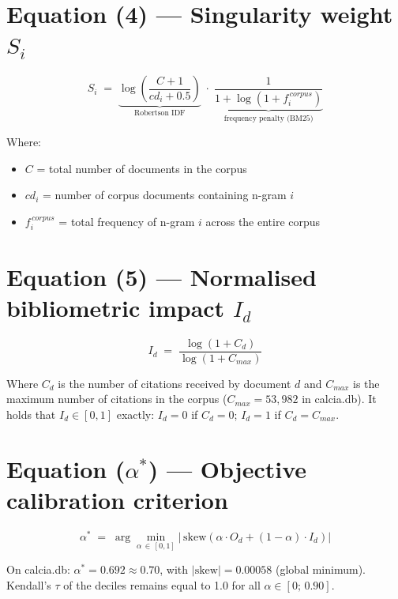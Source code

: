 \documentclass[12pt]{article}
\begin{document}
\section*{Equation (4) — Singularity weight $S_i$}

\begin{equation}
S_i \;=\;
\underbrace{\log\!\left(\frac{C+1}{cd_i + 0{.}5}\right)}_{\text{Robertson IDF}}
\;\cdot\;
\underbrace{\frac{1}{1 + \log\!\left(1 + f_i^{\,corpus}\right)}}_{\text{frequency penalty (BM25)}}
\label{eq:si}
\end{equation}

\noindent
Where:
\begin{itemize}
  \item $C$ = total number of documents in the corpus
  \item $cd_i$ = number of corpus documents containing n-gram $i$
  \item $f_i^{\,corpus}$ = total frequency of n-gram $i$ across the entire corpus
\end{itemize}

\section*{Equation (5) — Normalised bibliometric impact $I_d$}

\begin{equation}
I_d \;=\; \frac{\log(1 + C_d)}{\log(1 + C_{max})}
\label{eq:id}
\end{equation}

\noindent
Where $C_d$ is the number of citations received by document $d$ and
$C_{max}$ is the maximum number of citations in the corpus
($C_{max} = 53{,}982$ in calcia.db).
It holds that $I_d \in [0,1]$ exactly: $I_d = 0$ if $C_d = 0$;
$I_d = 1$ if $C_d = C_{max}$.

\section*{Equation ($\alpha^*$) — Objective calibration criterion}

\begin{equation}
\alpha^* \;=\; \arg\min_{\alpha \,\in\, [0,1]}
\left|\,\mathrm{skew}\!\left(\alpha \cdot O_d + (1-\alpha)\cdot I_d\right)\right|
\label{eq:alpha}
\end{equation}

\noindent
On calcia.db: $\alpha^* = 0{.}692 \approx 0{.}70$, with $|\mathrm{skew}| = 0{.}00058$
(global minimum). Kendall's $\tau$ of the deciles remains equal to 1.0 for
all $\alpha \in [0;\, 0{.}90]$.
\end{document}
